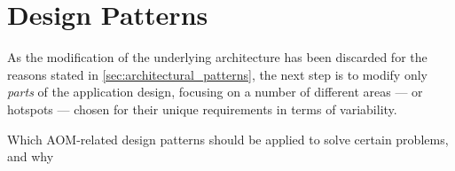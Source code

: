 \section{Design Patterns}\label{sec:design_patterns}

As the modification of the underlying architecture has been discarded for the reasons stated in \ref{sec:architectural_patterns}, the next step is to modify only \emph{parts} of the application design, focusing on a number of different areas --- or hotspots --- chosen for their unique requirements in terms of variability.

Which AOM-related design patterns should be applied to solve certain problems, and why

